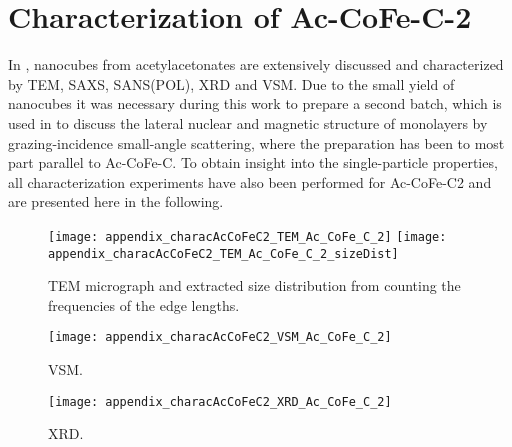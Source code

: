 \documentclass[\main/dresen_thesis.tex]{subfiles}
\begin{document}
\chapter{Characterization of Ac-CoFe-C-2}\label{app:characterizationAcCoFeC2}
  In , nanocubes from acetylacetonates are extensively discussed and characterized by TEM, SAXS, SANS(POL), XRD and VSM.
  Due to the small yield of nanocubes it was necessary during this work to prepare a second batch, which is used in  to discuss the lateral nuclear and magnetic structure of monolayers by grazing-incidence small-angle scattering, where the preparation has been to most part parallel to Ac-CoFe-C.
  To obtain insight into the single-particle properties, all characterization experiments have also been performed for Ac-CoFe-C2 and are presented here in the following.

  \begin{figure}
    \centering
    \texttt{[image: appendix\_characAcCoFeC2\_TEM\_Ac\_CoFe\_C\_2]}
    \texttt{[image: appendix\_characAcCoFeC2\_TEM\_Ac\_CoFe\_C\_2\_sizeDist]}
    \caption{\label{app:characterizationAcCoFeC2:TEM}TEM micrograph and extracted size distribution from counting the frequencies of the edge lengths.}
  \end{figure}


  \begin{figure}
    \centering
    \texttt{[image: appendix\_characAcCoFeC2\_VSM\_Ac\_CoFe\_C\_2]}
    \caption{\label{app:characterizationAcCoFeC2:VSM}VSM.}
  \end{figure}
  \begin{figure}
    \centering
    \texttt{[image: appendix\_characAcCoFeC2\_XRD\_Ac\_CoFe\_C\_2]}
    \caption{\label{app:characterizationAcCoFeC2:XRD}XRD.}
  \end{figure}
  
  
\end{document}
